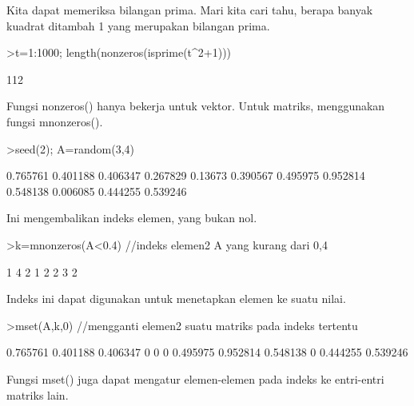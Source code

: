 \documentclass{article}
\begin{document}
\begin{eulernotebook}
\begin{eulercomment}
Kita dapat memeriksa bilangan prima. Mari kita cari tahu, berapa
banyak kuadrat ditambah 1 yang merupakan bilangan prima.
\end{eulercomment}
\begin{eulerprompt}
>t=1:1000; length(nonzeros(isprime(t^2+1)))
\end{eulerprompt}
\begin{euleroutput}
  112
\end{euleroutput}
\begin{eulercomment}
Fungsi nonzeros() hanya bekerja untuk vektor. Untuk matriks,
menggunakan fungsi mnonzeros().
\end{eulercomment}
\begin{eulerprompt}
>seed(2); A=random(3,4)
\end{eulerprompt}
\begin{euleroutput}
       0.765761      0.401188      0.406347      0.267829 
        0.13673      0.390567      0.495975      0.952814 
       0.548138      0.006085      0.444255      0.539246 
\end{euleroutput}
\begin{eulercomment}
Ini mengembalikan indeks elemen, yang bukan nol.
\end{eulercomment}
\begin{eulerprompt}
>k=mnonzeros(A<0.4) //indeks elemen2 A yang kurang dari 0,4
\end{eulerprompt}
\begin{euleroutput}
              1             4 
              2             1 
              2             2 
              3             2 
\end{euleroutput}
\begin{eulercomment}
Indeks ini dapat digunakan untuk menetapkan elemen ke suatu nilai.
\end{eulercomment}
\begin{eulerprompt}
>mset(A,k,0) //mengganti elemen2 suatu matriks pada indeks tertentu
\end{eulerprompt}
\begin{euleroutput}
       0.765761      0.401188      0.406347             0 
              0             0      0.495975      0.952814 
       0.548138             0      0.444255      0.539246 
\end{euleroutput}
\begin{eulercomment}
Fungsi mset() juga dapat mengatur elemen-elemen pada indeks ke
entri-entri matriks lain.
\end{eulercomment}
\begin{eulerprompt}

\end{eulerprompt}
\end{eulernotebook}
\end{document}
